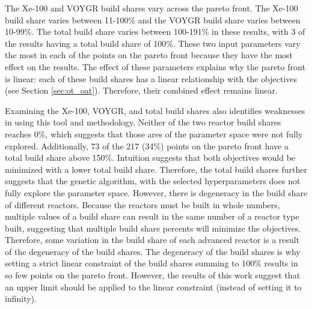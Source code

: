 The Xe-100 and VOYGR build shares vary across the pareto front. The Xe-100 
build share varies between 11-100\% and the VOYGR build share varies 
between 10-99\%. The total build share varies between 100-191\% in these 
results, with 3 of the results having a total build share of 100\%. 
These two input parameters vary the most in each of the points on 
the pareto front because they have the most effect on the results. The effect of 
these parameters explains why the pareto front is linear: each of these 
build shares has a linear relationship with the objectives (see Section 
\ref{sec:ot_oat}). Therefore, their combined effect remains linear.

Examining the Xe-100, VOYGR, and total build shares also identifies 
weaknesses in using this tool and methodology. Neither of the two reactor 
build shares reaches 0\%, which suggests that those ares of the parameter 
space were not fully explored. Additionally, 73 of the 217 (34\%) points 
on the pareto front have a total build share above 150\%. Intuition 
suggests that both objectives would be minimized with a lower total 
build share. Therefore, the total build shares further suggests that the 
genetic algorithm, with the selected hyperparameters does not fully 
explore the parameter space. 
However, there is degeneracy in the build share of different reactors. 
Because the reactors must be built in whole numbers, multiple values of 
a build share can result in the same number of a reactor type built, 
suggesting that multiple build share percents will minimize the 
objectives. Therefore, some variation in the build share of each 
advanced reactor is a result of the degeneracy of the build 
shares. The degeneracy of the build shares is why setting a strict 
linear constraint of the build shares summing to 100\% results in 
so few points on the pareto front. However, the results of this work 
suggest that an upper limit should be applied to the linear constraint 
(instead of setting it to infinity). 